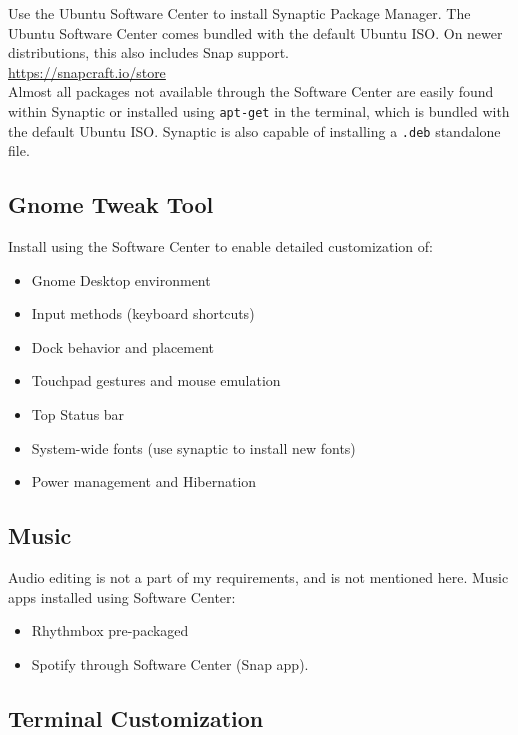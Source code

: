 \documentclass[12pt,letterpaper]{article}
\begin{document}
Use the Ubuntu Software Center to install Synaptic Package Manager. The Ubuntu Software Center comes bundled with the default Ubuntu ISO. On newer distributions, this also includes Snap support. \\

\url{https://snapcraft.io/store}\\

Almost all packages not available through the Software Center are easily found within Synaptic or installed using \texttt{apt-get} in the terminal, which is bundled with the default Ubuntu ISO. Synaptic is also capable of installing a \texttt{.deb} standalone file.

\subsection{Gnome Tweak Tool}
Install using the Software Center to enable detailed customization of:


\begin{itemize}
	\item Gnome Desktop environment 
	\item Input methods (keyboard shortcuts) 
	\item Dock behavior and placement
	\item Touchpad gestures and mouse emulation
	\item Top Status bar
	\item System-wide fonts (use synaptic to install new fonts) 
	\item Power management and Hibernation
\end{itemize}

\subsection{Music}

Audio editing is not a part of my requirements, and is not mentioned here.
Music apps installed using Software Center:

\begin{itemize}
	\item Rhythmbox pre-packaged
	\item Spotify through Software Center (Snap app).
\end{itemize}

\subsection{Terminal Customization}
\end{document}

